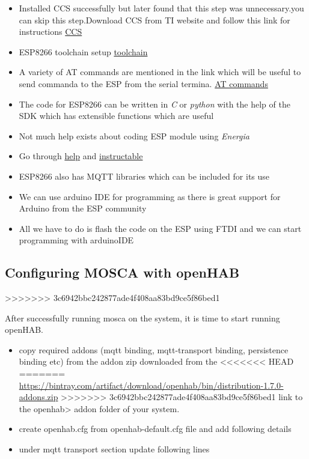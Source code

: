 \documentclass[16pt]{article}
\begin{document}
\begin{itemize}

\item
  Installed CCS successfully but later found that this step was unnecessary.you can skip this step.Download CCS from TI website and follow this link for instructions
  \href{http://processors.wiki.ti.com/index.php/Linux_Host_Support_CCSv6}{CCS}
\item ESP8266 toolchain setup   \href{https://github.com/esp8266/esp8266-wiki/wiki/Toolchain}{toolchain}
\item
  A variety of AT commands are mentioned in the link which will be
  useful to send commanda to the ESP from the serial termina. \href{https://nurdspace.nl/ESP8266#AT_Commands}{AT commands}
\item
  The code for ESP8266 can be written in \emph{C} or \emph{python} with
  the help of the SDK which has extensible functions which are useful
\item
  Not much help exists about coding ESP module using \emph{Energia}
\item Go through \href{http://hackaday.com/2014/12/08/compiling-your-own-programs-for-the-esp8266/}{help} and \href{http://www.instructables.com/id/ESP8266-mini-Tutorial/}{instructable}
\item
  ESP8266 also has MQTT libraries which can be included for its use
\item
  We can use arduino IDE for programming as there is great support for
  Arduino from the ESP community
\item
  All we have to do is flash the code on the ESP using FTDI and we can
  start programming with arduinoIDE
  
\end{itemize}


\subsection{Configuring MOSCA with
openHAB}


>>>>>>> 3c6942bbc242877ade4f408aa83bd9ce5f86bed1

After successfully running mosca on the system, it is time to start
running openHAB.

\begin{itemize}

\item
  copy required addons (mqtt binding, mqtt-transport binding,
  persistence binding etc) from the addon zip downloaded from the
<<<<<<< HEAD
=======
  \href{openHAB}{https://bintray.com/artifact/download/openhab/bin/distribution-1.7.0-addons.zip}
>>>>>>> 3c6942bbc242877ade4f408aa83bd9ce5f86bed1
  link to the openhab\textgreater{} addon folder of your system.
\item
  create openhab.cfg from openhab-default.cfg file and add following
  details
\item
  under mqtt transport section update following lines
\end{itemize}
\end{document}

